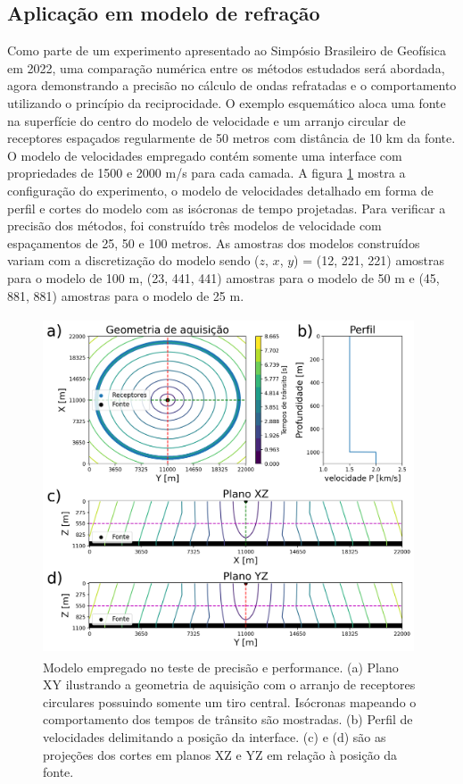 \subsection*{Aplicação em modelo de refração}

Como parte de um experimento apresentado ao Simpósio Brasileiro de Geofísica em 2022, uma comparação numérica entre os métodos estudados será abordada, agora demonstrando a precisão no cálculo de ondas refratadas e o comportamento utilizando o princípio da reciprocidade. O exemplo esquemático aloca uma fonte na superfície do centro do modelo de velocidade e um arranjo circular de receptores espaçados regularmente de 50 metros com distância de 10 km da fonte. O modelo de velocidades empregado contém somente uma interface com propriedades de 1500 e 2000 m/s para cada camada. A figura \ref{fig:configurationNumericalComparison} mostra a configuração do experimento, o modelo de velocidades detalhado em forma de perfil e cortes do modelo com as isócronas de tempo projetadas. Para verificar a precisão dos métodos, foi construído três modelos de velocidade com espaçamentos de 25, 50 e 100 metros.  
As amostras dos modelos construídos variam com a discretização do modelo sendo ($z$, $x$, $y$) = (12, 221, 221) amostras para o modelo de 100 m, (23, 441, 441) amostras para o modelo de 50 m e (45, 881, 881) amostras para o modelo de 25 m.

\begin{figure}[H]
	\centering
	\includegraphics[width = 11cm, height = 10cm]{Imgs/RevisaoBibliografica/modelGeometry.png}
	\caption{Modelo empregado no teste de precisão e performance. (a) Plano XY ilustrando a geometria de aquisição com o arranjo de receptores circulares possuindo somente um tiro central. Isócronas mapeando o comportamento dos tempos de trânsito são mostradas. (b) Perfil de velocidades delimitando a posição da interface. (c) e (d) são as projeções dos cortes em planos XZ e YZ em relação à posição da fonte.}
	\label{fig:configurationNumericalComparison}
\end{figure}

